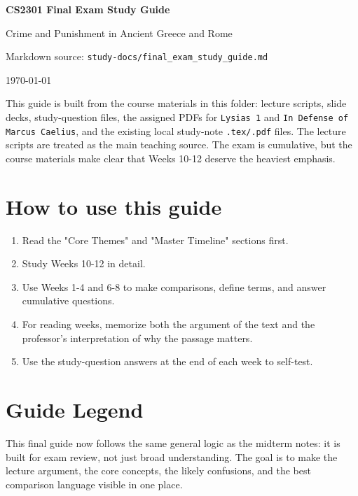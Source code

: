 \documentclass[11pt]{article}
\begin{document}
\begin{titlepage}
\centering
{\Huge\bfseries CS2301 Final Exam Study Guide\par}
\vspace{1em}
{\Large Crime and Punishment in Ancient Greece and Rome\par}
\vspace{1.5em}
{\large Markdown source: \texttt{study-docs/final\_exam\_study\_guide.md}\par}
\vfill
{\large \today\par}
\end{titlepage}
\tableofcontents
\newpage
This guide is built from the course materials in this folder: lecture scripts, slide decks, study-question files, the assigned PDFs for \texttt{Lysias 1} and \texttt{In Defense of Marcus Caelius}, and the existing local study-note \texttt{.tex/.pdf} files. The lecture scripts are treated as the main teaching source. The exam is cumulative, but the course materials make clear that Weeks 10-12 deserve the heaviest emphasis.

\section{How to use this guide}

\begin{enumerate}
\item Read the "Core Themes" and "Master Timeline" sections first.
\item Study Weeks 10-12 in detail.
\item Use Weeks 1-4 and 6-8 to make comparisons, define terms, and answer cumulative questions.
\item For reading weeks, memorize both the argument of the text and the professor's interpretation of why the passage matters.
\item Use the study-question answers at the end of each week to self-test.
\end{enumerate}

\section{Guide Legend}

This final guide now follows the same general logic as the midterm notes: it is built for exam review, not just broad understanding. The goal is to make the lecture argument, the core concepts, the likely confusions, and the best comparison language visible in one place.
\end{document}
